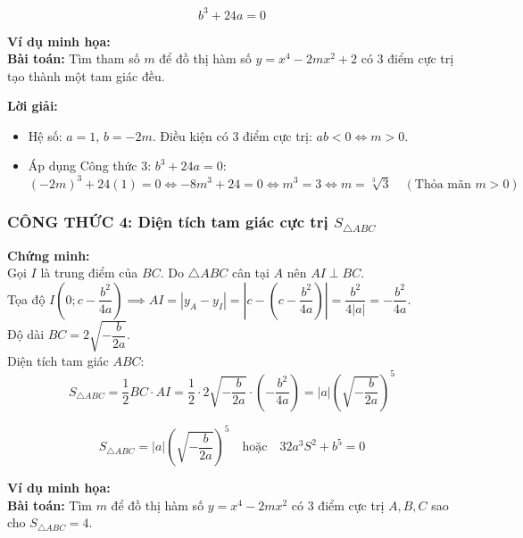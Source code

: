 \begin{itemize}
\begin{tcolorbox}[title=CÔNG THỨC GIẢI NHANH 3]
\[
b^3 + 24a = 0
\]
\end{tcolorbox}

\noindent \textbf{Ví dụ minh họa:} \\
\textbf{Bài toán:} Tìm tham số $m$ để đồ thị hàm số $y = x^4 - 2mx^2 + 2$ có 3 điểm cực trị tạo thành một tam giác đều.

\noindent \textbf{Lời giải:}
\begin{itemize}
    \item Hệ số: $a = 1$, $b = -2m$. Điều kiện có 3 điểm cực trị: $ab < 0 \iff m > 0$.
    \item Áp dụng Công thức 3: $b^3 + 24a = 0$:
    \[
    (-2m)^3 + 24(1) = 0 \iff -8m^3 + 24 = 0 \iff m^3 = 3 \iff m = \sqrt[3]{3} \quad (\text{Thỏa mãn } m > 0)
    \]
\end{itemize}


\vspace{0.5cm}

\subsubsection{CÔNG THỨC 4: Diện tích tam giác cực trị $S_{\triangle ABC}$}

\noindent \textbf{Chứng minh:} \\
Gọi $I$ là trung điểm của $BC$. Do $\triangle ABC$ cân tại $A$ nên $AI \perp BC$. \\
Tọa độ $I\left(0; c - \dfrac{b^2}{4a}\right) \implies AI = \left|y_A - y_I\right| = \left|c - \left(c - \dfrac{b^2}{4a}\right)\right| = \dfrac{b^2}{4|a|} = -\dfrac{b^2}{4a}$. \\
Độ dài $BC = 2\sqrt{-\dfrac{b}{2a}}$. \\
Diện tích tam giác $ABC$:
\[
S_{\triangle ABC} = \frac{1}{2} BC \cdot AI = \frac{1}{2} \cdot 2\sqrt{-\frac{b}{2a}} \cdot \left(-\frac{b^2}{4a}\right) = |a| \left(\sqrt{-\frac{b}{2a}}\right)^5
\]

\begin{tcolorbox}[title=CÔNG THỨC GIẢI NHANH 4]
\[
S_{\triangle ABC} = |a| \left(\sqrt{-\frac{b}{2a}}\right)^5 \quad \text{hoặc} \quad 32 a^3 S^2 + b^5 = 0
\]
\end{tcolorbox}

\noindent \textbf{Ví dụ minh họa:} \\
\textbf{Bài toán:} Tìm $m$ để đồ thị hàm số $y = x^4 - 2mx^2$ có 3 điểm cực trị $A, B, C$ sao cho $S_{\triangle ABC} = 4$.


\end{itemize}
